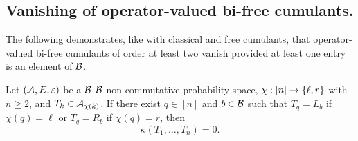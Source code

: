 		\subsection{Vanishing of operator-valued bi-free cumulants.}

		The following demonstrates, like with classical and free cumulants, that operator-valued bi-free cumulants of order at least two vanish provided at least one entry is an element of $\mathcal{B}$.
		\begin{proposition}
			\label{prop:inputaL_borR_bandyougetzerocumulants}
			Let $(\mathcal{A}, E, \varepsilon)$ be a $\mathcal{B}$-$\mathcal{B}$-non-commutative probability space, $\chi : [n] \to \left\{\ell, r\right\}$ with $n \geq 2$, and $T_k \in \mathcal{A}_{\chi(k)}$.
			If there exist $q \in [n]$ and $b \in \mathcal{B}$ such that $T_q = L_b$ if $\chi(q) = \ell$ or $T_q = R_b$ if $\chi(q) = r$, then
			\[
				\kappa(T_1, \ldots, T_n) = 0.
			\]
		\end{proposition}


